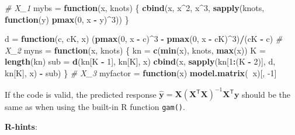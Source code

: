 \documentclass[]{article}
\newenvironment{Shaded}{\begin{snugshade}}{\end{snugshade}}
\newcommand{\KeywordTok}[1]{\textcolor[rgb]{0.13,0.29,0.53}{\textbf{#1}}}
\newcommand{\DecValTok}[1]{\textcolor[rgb]{0.00,0.00,0.81}{#1}}
\newcommand{\StringTok}[1]{\textcolor[rgb]{0.31,0.60,0.02}{#1}}
\newcommand{\CommentTok}[1]{\textcolor[rgb]{0.56,0.35,0.01}{\textit{#1}}}
\newcommand{\ControlFlowTok}[1]{\textcolor[rgb]{0.13,0.29,0.53}{\textbf{#1}}}
\newcommand{\OperatorTok}[1]{\textcolor[rgb]{0.81,0.36,0.00}{\textbf{#1}}}
\newcommand{\NormalTok}[1]{#1}
\begin{document}
\begin{Shaded}
\begin{Highlighting}[]
\CommentTok{# X_1}
\NormalTok{mybs =}\StringTok{ }\ControlFlowTok{function}\NormalTok{(x, knots) \{}
    \KeywordTok{cbind}\NormalTok{(x, x}\OperatorTok{^}\DecValTok{2}\NormalTok{, x}\OperatorTok{^}\DecValTok{3}\NormalTok{, }\KeywordTok{sapply}\NormalTok{(knots, }\ControlFlowTok{function}\NormalTok{(y) }\KeywordTok{pmax}\NormalTok{(}\DecValTok{0}\NormalTok{, x }\OperatorTok{-}\StringTok{ }\NormalTok{y)}\OperatorTok{^}\DecValTok{3}\NormalTok{))}
\NormalTok{\}}

\NormalTok{d =}\StringTok{ }\ControlFlowTok{function}\NormalTok{(c, cK, x) (}\KeywordTok{pmax}\NormalTok{(}\DecValTok{0}\NormalTok{, x }\OperatorTok{-}\StringTok{ }\NormalTok{c)}\OperatorTok{^}\DecValTok{3} \OperatorTok{-}\StringTok{ }\KeywordTok{pmax}\NormalTok{(}\DecValTok{0}\NormalTok{, x }\OperatorTok{-}\StringTok{ }\NormalTok{cK)}\OperatorTok{^}\DecValTok{3}\NormalTok{)}\OperatorTok{/}\NormalTok{(cK }\OperatorTok{-}\StringTok{ }\NormalTok{c)}
\CommentTok{# X_2}
\NormalTok{myns =}\StringTok{ }\ControlFlowTok{function}\NormalTok{(x, knots) \{}
\NormalTok{    kn =}\StringTok{ }\KeywordTok{c}\NormalTok{(}\KeywordTok{min}\NormalTok{(x), knots, }\KeywordTok{max}\NormalTok{(x))}
\NormalTok{    K =}\StringTok{ }\KeywordTok{length}\NormalTok{(kn)}
\NormalTok{    sub =}\StringTok{ }\KeywordTok{d}\NormalTok{(kn[K }\OperatorTok{-}\StringTok{ }\DecValTok{1}\NormalTok{], kn[K], x)}
    \KeywordTok{cbind}\NormalTok{(x, }\KeywordTok{sapply}\NormalTok{(kn[}\DecValTok{1}\OperatorTok{:}\NormalTok{(K }\OperatorTok{-}\StringTok{ }\DecValTok{2}\NormalTok{)], d, kn[K], x) }\OperatorTok{-}\StringTok{ }\NormalTok{sub)}
\NormalTok{\}}
\CommentTok{# X_3}
\NormalTok{myfactor =}\StringTok{ }\ControlFlowTok{function}\NormalTok{(x) }\KeywordTok{model.matrix}\NormalTok{(}\OperatorTok{~}\NormalTok{x)[, }\DecValTok{-1}\NormalTok{]}
\end{Highlighting}
\end{Shaded}

If the code is valid, the predicted response
\(\hat{\mathbf y} = \mathbf X(\mathbf X^\mathsf{T} \mathbf X)^{-1} \mathbf X^\mathsf{T} \mathbf y\)
should be the same as when using the built-in R function \texttt{gam()}.

\textbf{R-hints}:
\end{document}
